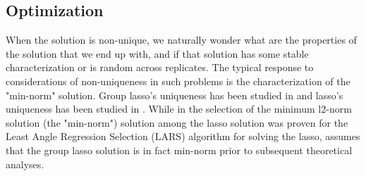 



\subsection{Optimization}

When the solution is non-unique, we naturally wonder what are the properties of the solution that we end up with, and if that solution has some stable characterization or is random across replicates.
The typical response to considerations of non-uniqueness in such problems is the characterization of the "min-norm" solution.
Group lasso's uniqueness has been studied in \citet{Mishkin2022-yf} and lasso's uniqueness has been studied in \citet{Tibshirani2012-vw}.
While in \citet{Tibshirani2012-vw} the selection of the minimum l2-norm solution (the "min-norm") solution among the lasso solution was proven for the Least Angle Regression Selection (LARS) algorithm for solving the lasso, \citet{Mishkin2022-yf} assumes that the group lasso solution is in fact min-norm prior to subsequent theoretical analyses.

